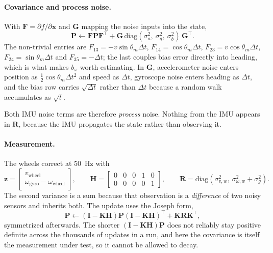 \paragraph{Covariance and process noise.} With $\mathbf{F}=\partial f/\partial
\mathbf{x}$ and $\mathbf{G}$ mapping the noise inputs into the state,
\begin{equation}
  \mathbf{P} \leftarrow \mathbf{F}\mathbf{P}\mathbf{F}^{\top}
    + \mathbf{G}\,\mathrm{diag}(\sigma_a^2,\ \sigma_g^2,\ \sigma_{b}^2)\,\mathbf{G}^{\top}.
  \label{eq:ekf-predict}
\end{equation}
The non-trivial entries are
$F_{13}=-v\sin\theta_m\Delta t$, $F_{14}=\cos\theta_m\Delta t$,
$F_{23}=v\cos\theta_m\Delta t$, $F_{24}=\sin\theta_m\Delta t$ and
$F_{35}=-\Delta t$; the last couples bias error directly into heading, which is
what makes $b_\omega$ worth estimating. In $\mathbf{G}$, accelerometer noise
enters position as $\tfrac{1}{2}\cos\theta_m\Delta t^2$ and speed as $\Delta t$,
gyroscope noise enters heading as $\Delta t$, and the bias row carries
$\sqrt{\Delta t}$ rather than $\Delta t$ because a random walk accumulates as
$\sqrt{t}$.

Both IMU noise terms are therefore \emph{process} noise. Nothing from the IMU
appears in $\mathbf{R}$, because the IMU propagates the state rather than
observing it.

\paragraph{Measurement.} The wheels correct at \SI{50}{\hertz} with
\begin{equation}
  \mathbf{z} = \begin{bmatrix}v_{\text{wheel}} \\
    \omega_{\text{gyro}} - \omega_{\text{wheel}}\end{bmatrix}, \qquad
  \mathbf{H} = \begin{bmatrix}0&0&0&1&0\\ 0&0&0&0&1\end{bmatrix}, \qquad
  \mathbf{R} = \mathrm{diag}\!\left(\sigma_{v,w}^2,\ \sigma_{\omega,w}^2+\sigma_g^2\right).
  \label{eq:ekf-update}
\end{equation}
The second variance is a sum because that observation is a \emph{difference} of
two noisy sensors and inherits both. The update uses the Joseph form,
\begin{equation}
  \mathbf{P} \leftarrow (\mathbf{I}-\mathbf{K}\mathbf{H})\mathbf{P}
    (\mathbf{I}-\mathbf{K}\mathbf{H})^{\top} + \mathbf{K}\mathbf{R}\mathbf{K}^{\top},
  \label{eq:ekf-joseph}
\end{equation}
symmetrized afterwards. The shorter $(\mathbf{I}-\mathbf{K}\mathbf{H})\mathbf{P}$
does not reliably stay positive definite across the thousands of updates in a
run, and here the covariance is itself the measurement under test, so it cannot
be allowed to decay.

